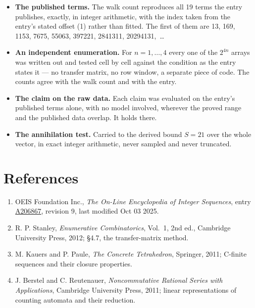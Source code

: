 \documentclass[11pt]{article}
\theoremstyle{definition}
\begin{document}
\begin{itemize}

\item {\bfseries The published terms.} The walk count reproduces all 19 terms the entry publishes, exactly, in integer arithmetic, with the index taken from the entry's stated offset (1) rather than fitted. The first of them are 13, 169, 1153, 7675, 55063, 397221, 2841311, 20294131,~\dots

\item {\bfseries An independent enumeration.} For $n = 1,\dots,4$ every one of the $2^{4n}$ arrays was written out and tested cell by cell against the condition as the entry states it --- no transfer matrix, no row window, a separate piece of code. The counts agree with the walk count and with the entry.

\item {\bfseries The claim on the raw data.} Each claim was evaluated on the entry's published terms alone, with no model involved, wherever the proved range and the published data overlap. It holds there.

\item {\bfseries The annihilation test.} Carried to the derived bound $S = 21$ over the whole vector, in exact integer arithmetic, never sampled and never truncated.

\end{itemize}

\section{References}

\begin{enumerate}

\item OEIS Foundation Inc., \emph{The On-Line Encyclopedia of Integer Sequences}, entry \href{https://oeis.org/A206867}{A206867}, revision 9, last modified Oct 03 2025.

\item R. P. Stanley, \emph{Enumerative Combinatorics}, Vol.~1, 2nd ed., Cambridge University Press, 2012; \S4.7, the transfer-matrix method.

\item M. Kauers and P. Paule, \emph{The Concrete Tetrahedron}, Springer, 2011; C-finite sequences and their closure properties.

\item J. Berstel and C. Reutenauer, \emph{Noncommutative Rational Series with Applications}, Cambridge University Press, 2011; linear representations of counting automata and their reduction.

\end{enumerate}
\end{document}

